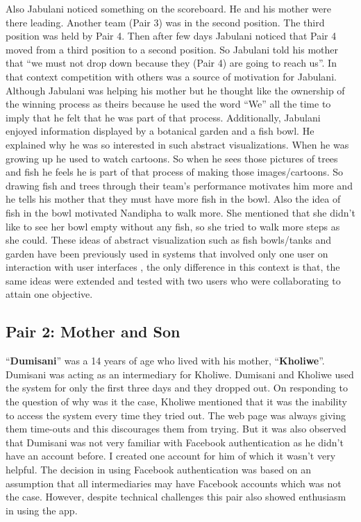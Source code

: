 Also Jabulani noticed something on the scoreboard. He and his mother were there leading. Another team (Pair 3) was in the second position. The third position was held by Pair 4. Then after few days Jabulani noticed that Pair 4 moved from a third position to a second position. So Jabulani told his mother that ``we must not drop down because they (Pair 4) are going to reach us''. In that context competition with others was a source of motivation for Jabulani. Although Jabulani was helping his mother but he thought like the ownership of the winning process as theirs because he used the word “We” all the time to imply that he felt that he was part of that process. Additionally, Jabulani enjoyed information displayed by a botanical garden and a fish bowl. He explained why he was so interested in such abstract visualizations. When he was growing up he used to watch cartoons. So when he sees those pictures of trees and fish he feels he is part of that process of making those images/cartoons. So drawing fish and trees through their team's performance motivates him more and he tells his mother that they must have more fish in the bowl. Also the idea of fish in the bowl motivated Nandipha to walk more. She mentioned  that she didn't like to see her bowl empty without any fish, so she tried to walk more steps as she could. These ideas of abstract visualization such as fish bowls/tanks and garden have been previously used in systems that involved only one user on interaction with user interfaces \citep{lin2006:fish, klasnja2009:using}, the only difference in this context is that, the same ideas were extended and tested with two users who were collaborating to attain one objective. 
\subsection*{\textbf{Pair 2: Mother and Son}}
``\textbf{Dumisani}'' was a 14 years of age who lived with his mother, ``\textbf{Kholiwe}''. Dumisani was acting as an intermediary for Kholiwe. Dumisani and Kholiwe used the system for only the first three days and they dropped out. On responding to the question of why was it the case, Kholiwe mentioned that it was the inability to access the system every time they tried out. The web page was always giving them time-outs and this discourages them from trying. But it was also observed that Dumisani was not very familiar with Facebook authentication as he didn't have an account before. I created one account for him of which it wasn't very helpful. The decision in using Facebook authentication was based on an assumption that all intermediaries may have Facebook accounts which was not the case. However, despite technical challenges this pair also showed enthusiasm in using the app.
